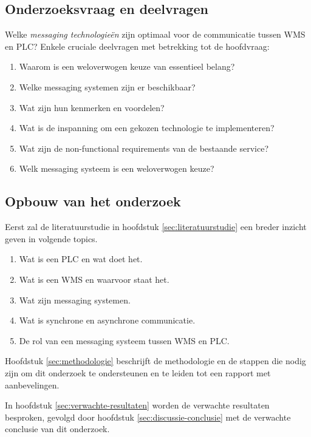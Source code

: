 \subsection{Onderzoeksvraag en deelvragen}

Welke \emph{messaging technologieën} zijn optimaal voor de communicatie tussen WMS en PLC?
Enkele cruciale deelvragen met betrekking tot de hoofdvraag:

\begin{enumerate}
  \item Waarom is een weloverwogen keuze van essentieel belang?
  \item Welke messaging systemen zijn er beschikbaar?
  \item Wat zijn hun kenmerken en voordelen?
  \item Wat is de inspanning om een gekozen technologie te implementeren?
  \item Wat zijn de non-functional requirements van de bestaande service?
  \item Welk messaging systeem is een weloverwogen keuze?
\end{enumerate}

\subsection{Opbouw van het onderzoek}
Eerst zal de literatuurstudie in hoofdstuk \ref{sec:literatuurstudie} een breder inzicht geven in volgende topics.
\begin{enumerate}
  \item Wat is een PLC en wat doet het.
  \item Wat is een WMS en waarvoor staat het.
  \item Wat zijn messaging systemen.
  \item Wat is synchrone en asynchrone communicatie. 
  \item De rol van een messaging systeem tussen WMS en PLC.
\end{enumerate}

Hoofdstuk \ref{sec:methodologie} beschrijft de methodologie en de stappen die nodig zijn om dit onderzoek te ondersteunen
en te leiden tot een rapport met aanbevelingen. 

In hoofdstuk \ref{sec:verwachte-resultaten} worden de verwachte resultaten besproken, gevolgd door 
hoofdstuk \ref{sec:discussie-conclusie} met de verwachte conclusie van dit onderzoek.

\bigskip



